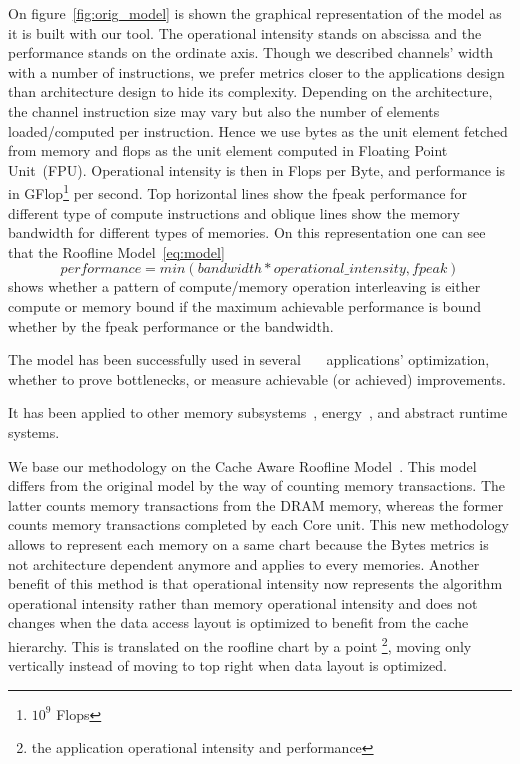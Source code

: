\documentclass[twoside,twocolumn,8pt]{extarticle}
\begin{document}
On figure~\ref{fig:orig_model} is shown the graphical representation of the model as it is built with our tool.
The operational intensity stands on abscissa and the performance stands on the ordinate axis.
Though we described channels' width with a number of instructions, we prefer metrics closer to the applications design than
architecture design to hide its complexity.
Depending on the architecture, the channel instruction size may vary but also the number of elements loaded/computed per
instruction.
Hence we use bytes as the unit element fetched from memory and flops as the unit element computed in Floating Point Unit~(FPU).
Operational intensity is then in Flops per Byte, and performance is in GFlop\footnote{$10^9$ Flops} per second.
Top horizontal lines show the fpeak performance for different type of compute instructions and
oblique lines show the memory bandwidth for different types of memories. On this representation
one can see that the Roofline Model~\eqref{eq:model}
\begin{equation}
  performance = min(bandwidth*operational\_intensity, fpeak)
  \label{eq:model}
\end{equation}
shows whether a pattern of compute/memory
operation interleaving is either compute or memory bound if the maximum achievable performance is bound whether by the fpeak
performance or the bandwidth.

The model has been successfully used in
several~\cite{Kim20111201}~\cite{Rossinelli2164}~\cite{vanNieuwpoort:2009:UMH:1542275.1542337} applications' optimization, whether
to prove bottlenecks, or measure achievable (or achieved) improvements.

It has been applied to other memory subsystems~\cite{ilic2014cache}, energy~\cite{7493653}, and abstract runtime systems.

We base our methodology on the Cache Aware Roofline Model~\cite{ilic2014cache}.
This model differs from the original model by the way of counting memory transactions.
The latter counts memory transactions from the DRAM memory, whereas the former counts memory transactions completed by each
Core unit.
This new methodology allows to represent each memory on a same chart because the Bytes metrics is not architecture dependent
anymore and applies to every memories.
Another benefit of this method is that operational intensity now represents the algorithm operational intensity rather than memory
operational intensity and does not changes when the data access layout is optimized to benefit from the cache hierarchy.
This is translated on the roofline chart by a point \footnote{the application operational intensity and performance}, moving only
vertically instead of moving to top right when data layout is optimized.
\end{document}
